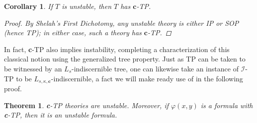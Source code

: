 \documentclass{article}
\newcommand{\calI}{\mathcal{I}}
\newcommand{\vphi}{\varphi}
\newtheorem{theorem}{Theorem}
\newtheorem{corollary}{Corollary}
\theoremstyle{definition}
\theoremstyle{definition}
\theoremstyle{definition}
\theoremstyle{definition}
\begin{document}
\begin{corollary}{}
If $T$ is unstable, then $T$ has $\textbf{c}$-TP.
\begin{proof}
    By Shelah's First Dichotomy, any unstable theory is either IP or SOP (hence TP); in either case, such a theory has $\textbf{c}$-TP.
\end{proof}
\end{corollary}

In fact, \textbf{c}-TP also implies instability, completing a characterization of this classical notion using the generalized tree property. Just as TP can be taken to be witnessed by an $L_s$-indiscernible tree, one can likewise take an instance of $\calI$-TP to be $L_{s,\kappa,\textbf{c}}$-indiscernible, a fact we will make ready use of in the following proof.


\begin{theorem}\label{c-TP unstable theorem}
    \textbf{c}-TP theories are unstable. Moreover, if $\vphi(x,y)$ is a formula with \textbf{c}-TP, then it is an unstable formula.
\end{theorem}
\end{document}
